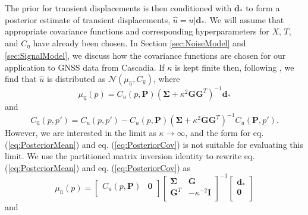 \documentclass[10pt,letter]{article}
\begin{document}
The prior for transient displacements is then conditioned with $\bm{d}_*$ to form a posterior estimate of transient displacements, $\hat{u} = u | \bm{d}_*$. We will assume that appropriate covariance functions and corresponding hyperparameters for $X$, $T$, and $C_\eta$ have already been chosen. In Section \ref{sec:NoiseModel} and \ref{sec:SignalModel}, we discuss how the covariance functions are chosen for our application to GNSS data from Cascadia. If $\kappa$ is kept finite then, following \citet{Rasmussen2006}, we find that $\hat{u}$ is distributed as $\mathcal{N}(\mu_{\hat{u}},C_{\hat{u}})$, where
\begin{equation}\label{eq:PosteriorMean}
\mu_{\hat{u}}(p) = C_u(p,\bm{P})\left(\bm{\Sigma} + \kappa^2\bm{G}\bm{G}^T\right)^{-1}\bm{d}_*
\end{equation}    
and
\begin{equation}\label{eq:PosteriorCov}
C_{\hat{u}}(p,p') = C_u(p,p') - C_u(p,\bm{P})\left(\bm{\Sigma} + \kappa^2\bm{G}\bm{G}^T\right)^{-1}C_u(\bm{P},p').
\end{equation}
However, we are interested in the limit as $\kappa \to \infty$, and the form for eq. (\ref{eq:PosteriorMean}) and eq. (\ref{eq:PosteriorCov}) is not suitable for evaluating this limit. We use the partitioned matrix inversion identity \citep[e.g.,][]{Press2007} to rewrite eq. (\ref{eq:PosteriorMean}) and eq. (\ref{eq:PosteriorCov}) as
 \begin{equation}\label{eq:PosteriorMean2}
\mu_{\hat{u}}(p) = \left[\begin{array}{cc}
                         C_u(p,\bm{P}) & \bm{0} \\
                         \end{array}\right]
                   \left[\begin{array}{cc}
                         \bm{\Sigma} & \bm{G} \\
                         \bm{G}^T  & -\kappa^{-2} \bm{I} \\
                         \end{array}\right]^{-1}
                   \left[\begin{array}{c}
                         \bm{d}_* \\
                         \bm{0} \\
                         \end{array}\right]
\end{equation}    
and
\end{document}
